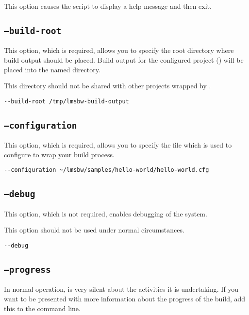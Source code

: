This option causes the script to display a help message and then exit.

\subsection{\texttt{--build-root}}

This option, which is required, allows you to specify the root
directory where build output should be placed.  Build output for the
configured project () will be placed
into the named directory.

This directory should not be shared with other projects wrapped by
\lmsbw.

\begin{verbatim}
--build-root /tmp/lmsbw-build-output
\end{verbatim}

\subsection{\texttt{--configuration}}\label{lmsbw:configuration}

This option, which is required, allows you to specify the file which
is used to configure \lmsbw to wrap your build process.

\begin{verbatim}
--configuration ~/lmsbw/samples/hello-world/hello-world.cfg
\end{verbatim}


\subsection{\texttt{--debug}}

This option, which is not required, enables debugging of the \lmsbw
system.

This option should not be used under normal circumstances.

\begin{verbatim}
--debug
\end{verbatim}

\subsection{\texttt{--progress}}

In normal operation, \lmsbw is very silent about the activities it is
undertaking.  If you want to be presented with more information about
the progress of the build, add this to the command line.

